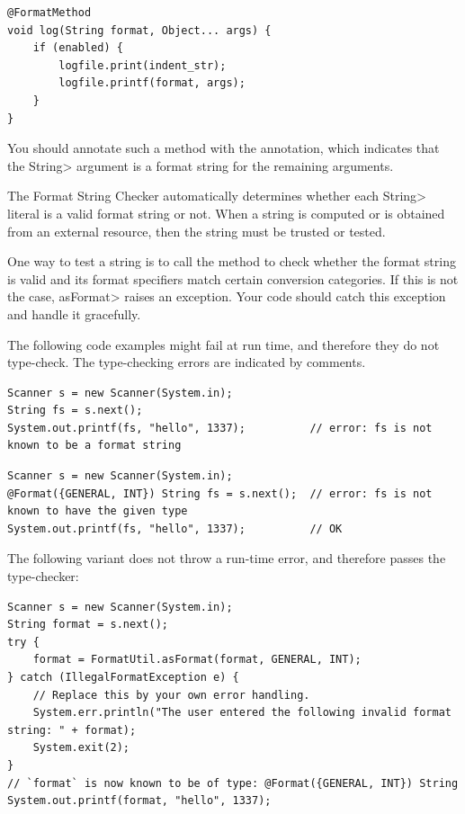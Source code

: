 \begin{Verbatim}
@FormatMethod
void log(String format, Object... args) {
    if (enabled) {
        logfile.print(indent_str);
        logfile.printf(format, args);
    }
}
\end{Verbatim}

You should annotate such a method with the
 annotation,
which indicates that the \<String> argument is a format string for the
remaining arguments.




The Format String Checker automatically determines whether each \<String>
literal is a valid format string or not.  When a string is computed or is
obtained from an external resource, then the string must be trusted or tested.

One way to test a string is to call the
method to check whether the format string is valid and its format
specifiers match certain conversion categories.
If this is not the case, \<asFormat> raises an exception.  Your code should
catch this exception and handle it gracefully.

The following code examples might fail at run time, and therefore they do not
type-check.  The type-checking errors are indicated by comments.

\begin{Verbatim}
Scanner s = new Scanner(System.in);
String fs = s.next();
System.out.printf(fs, "hello", 1337);          // error: fs is not known to be a format string
\end{Verbatim}

\begin{Verbatim}
Scanner s = new Scanner(System.in);
@Format({GENERAL, INT}) String fs = s.next();  // error: fs is not known to have the given type
System.out.printf(fs, "hello", 1337);          // OK
\end{Verbatim}

\noindent The following variant does not throw a run-time error, and
therefore passes the type-checker:

\begin{Verbatim}
Scanner s = new Scanner(System.in);
String format = s.next();
try {
    format = FormatUtil.asFormat(format, GENERAL, INT);
} catch (IllegalFormatException e) {
    // Replace this by your own error handling.
    System.err.println("The user entered the following invalid format string: " + format);
    System.exit(2);
}
// `format` is now known to be of type: @Format({GENERAL, INT}) String
System.out.printf(format, "hello", 1337);
\end{Verbatim}


